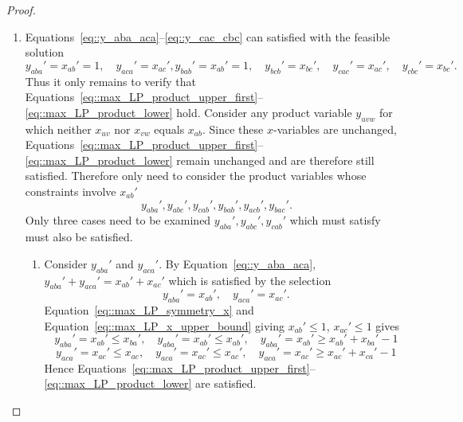 \documentclass[11pt]{article}
\begin{document}
\begin{proof}
\begin{enumerate}[label=\Alph*.]
\begin{enumerate}[label=(\roman*)]
        \item Since $g_{ac}=1$, Equations~\eqref{eq::max_LP_indicator_upper}--\eqref{eq::max_LP_indicator_lower} imply $z_{ac}' \geq 1$. Hence, by Equation~\eqref{eq::max_LP_indicator_arg},
          \[
          1 \leq z_{ac}'=\sum_{k\in\{a,b,c\}}y_{akc}'+x_{ac}'=y_{aac}'+y_{abc}'+y_{acc}'+x_{ac}'=y_{abc}'+x_{ac}',
          \]
          since Equations~\eqref{eq::max_LP_product_upper_first}--\eqref{eq::max_LP_product_upper_second} together with Equation~\eqref{eq::max_LP_diagonal_x} imply $y_{aac}'=y_{acc}'=0$. As $x_{ac}'=x_{ac}$, $y_{abc}' = y_{abc}$ satisfies the new equation, no additional constraints are needed. 
      \end{enumerate}
    \item Equations~\eqref{eq::y_aba_aca}--\eqref{eq::y_cac_cbc} can satisfied with the feasible solution
      \[
        y_{aba}'=x_{ab}'=1, \quad y_{aca}'=x_{ac}', y_{bab}'=x_{ab}'=1, \quad y_{bcb}'=x_{bc}', \quad y_{cac}'=x_{ac}', \quad y_{cbc}'=x_{bc}'.
      \]
      Thus it only remains to verify that Equations~\eqref{eq::max_LP_product_upper_first}--\eqref{eq::max_LP_product_lower} hold. Consider any product variable $y_{uvw}$ for which neither $x_{uv}$ nor $x_{vw}$ equals $x_{ab}$. Since these $x$-variables are unchanged, Equations~\eqref{eq::max_LP_product_upper_first}--\eqref{eq::max_LP_product_lower} remain unchanged and are therefore still satisfied. Therefore only need to consider the product variables whose constraints involve $x_{ab}'$
    \[
    y_{aba}',y_{abc}',y_{cab}',y_{bab}',y_{acb}',y_{bac}'. 
    \]
    Only three cases need to be examined $y_{aba}',y_{abc}',y_{cab}'$ which must satisfy 
      must also be satisfied.
      \begin{enumerate}[label=(\roman*)]
        \item Consider $y_{aba}'$ and $y_{aca}'$. By Equation~\eqref{eq::y_aba_aca}, $y_{aba}'+y_{aca}'=x_{ab}'+x_{ac}'$ which is satisfied by the selection
          \[
          y_{aba}'=x_{ab}',\quad y_{aca}'=x_{ac}'. 
          \] 
          Equation~\eqref{eq::max_LP_symmetry_x} and Equation~\eqref{eq::max_LP_x_upper_bound} giving $x_{ab}' \leq 1$, $x_{ac}' \leq 1$ gives
          \[
          y_{aba}'=x_{ab}' \leq x_{ba}',\quad y_{aba}'=x_{ab}'\leq x_{ab}', \quad y_{aba}'=x_{ab}' \geq x_{ab}'+x_{ba}'-1
          \]
          \[
          y_{aca}'=x_{ac}' \leq x_{ac},\quad y_{aca}'=x_{ac}' \leq x_{ac}', \quad y_{aca}'=x_{ac}' \geq x_{ac}'+x_{ca}'-1
          \]
          Hence Equations~\eqref{eq::max_LP_product_upper_first}--\eqref{eq::max_LP_product_lower} are satisfied.

\end{enumerate}
\end{enumerate}
\end{proof}
\end{document}
